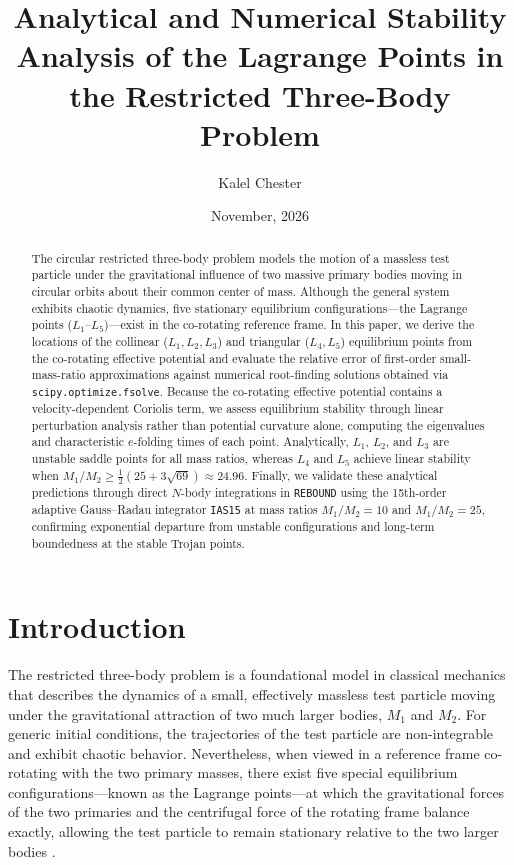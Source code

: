 \documentclass[12pt, letterpaper]{article}
\title{Analytical and Numerical Stability Analysis of the Lagrange Points in the Restricted Three-Body Problem}
\author{Kalel Chester}
\date{November, 2026}
\begin{document}
\maketitle

\begin{abstract}
The circular restricted three-body problem models the motion of a massless test particle under the gravitational influence of two massive primary bodies moving in circular orbits about their common center of mass. Although the general system exhibits chaotic dynamics, five stationary equilibrium configurations---the Lagrange points ($L_1$--$L_5$)---exist in the co-rotating reference frame. In this paper, we derive the locations of the collinear ($L_1, L_2, L_3$) and triangular ($L_4, L_5$) equilibrium points from the co-rotating effective potential and evaluate the relative error of first-order small-mass-ratio approximations against numerical root-finding solutions obtained via \texttt{scipy.optimize.\allowbreak fsolve}. Because the co-rotating effective potential contains a velocity-dependent Coriolis term, we assess equilibrium stability through linear perturbation analysis rather than potential curvature alone, computing the eigenvalues and characteristic $e$-folding times of each point. Analytically, $L_1$, $L_2$, and $L_3$ are unstable saddle points for all mass ratios, whereas $L_4$ and $L_5$ achieve linear stability when $M_1 / M_2 \ge \frac{1}{2}(25 + 3\sqrt{69}) \approx 24.96$. Finally, we validate these analytical predictions through direct $N$-body integrations in \texttt{REBOUND} using the 15th-order adaptive Gauss--Radau integrator \texttt{IAS15} at mass ratios $M_1/M_2 = 10$ and $M_1/M_2 = 25$, confirming exponential departure from unstable configurations and long-term boundedness at the stable Trojan points.
\end{abstract}

\section{Introduction}

The restricted three-body problem is a foundational model in classical mechanics that describes the dynamics of a small, effectively massless test particle moving under the gravitational attraction of two much larger bodies, $M_1$ and $M_2$. For generic initial conditions, the trajectories of the test particle are non-integrable and exhibit chaotic behavior. Nevertheless, when viewed in a reference frame co-rotating with the two primary masses, there exist five special equilibrium configurations---known as the Lagrange points---at which the gravitational forces of the two primaries and the centrifugal force of the rotating frame balance exactly, allowing the test particle to remain stationary relative to the two larger bodies \cite{cornish}.
\end{document}
